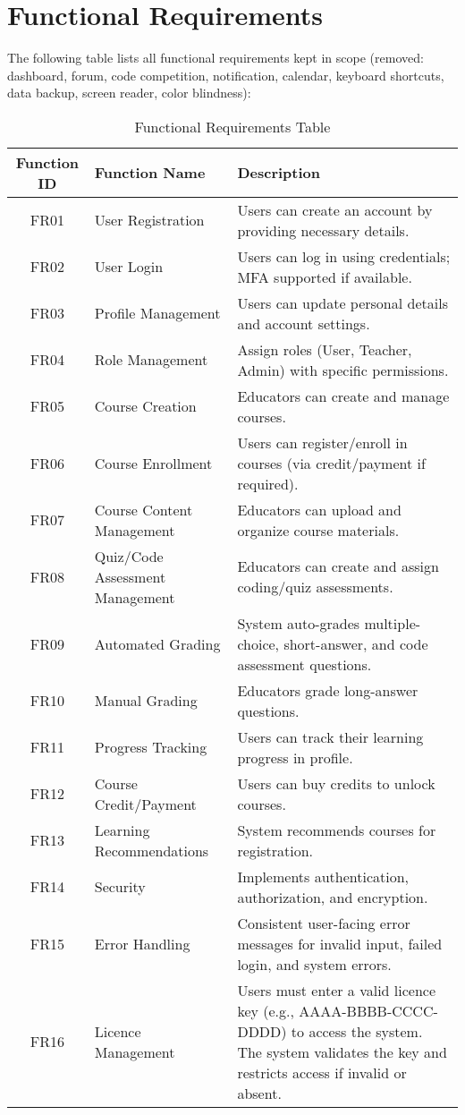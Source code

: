 \documentclass[a4paper, 11pt]{scrreprt}
\begin{document}
\section{Functional Requirements}

The following table lists all functional requirements kept in scope (removed: dashboard, forum, code competition, notification, calendar, keyboard shortcuts, data backup, screen reader, color blindness):

\begin{table}[h!]
    \centering
    \begin{tabular}{|c|l|p{10cm}|}
    \hline
    \textbf{Function ID} & \textbf{Function Name} & \textbf{Description} \\
    \hline
    FR01 & User Registration & Users can create an account by providing necessary details. \\
    FR02 & User Login & Users can log in using credentials; MFA supported if available. \\
    FR03 & Profile Management & Users can update personal details and account settings. \\
    FR04 & Role Management & Assign roles (User, Teacher, Admin) with specific permissions. \\
    FR05 & Course Creation & Educators can create and manage courses. \\
    FR06 & Course Enrollment & Users can register/enroll in courses (via credit/payment if required). \\
    FR07 & Course Content Management & Educators can upload and organize course materials. \\
    FR08 & Quiz/Code Assessment Management & Educators can create and assign coding/quiz assessments. \\
    FR09 & Automated Grading & System auto-grades multiple-choice, short-answer, and code assessment questions. \\
    FR10 & Manual Grading & Educators grade long-answer questions. \\
    FR11 & Progress Tracking & Users can track their learning progress in profile. \\
    FR12 & Course Credit/Payment & Users can buy credits to unlock courses. \\
    FR13 & Learning Recommendations & System recommends courses for registration. \\
    FR14 & Security & Implements authentication, authorization, and encryption. \\
    FR15 & Error Handling & Consistent user-facing error messages for invalid input, failed login, and system errors. \\
    FR16 & Licence Management & Users must enter a valid licence key (e.g., AAAA-BBBB-CCCC-DDDD) to access the system. The system validates the key and restricts access if invalid or absent. \\
    \hline
    \end{tabular}
    \caption{Functional Requirements Table}
\end{table}
\end{document}
